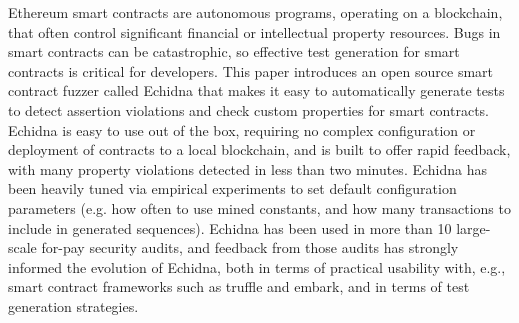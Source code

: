 Ethereum smart contracts are autonomous programs, operating on a blockchain, that often control significant financial or intellectual property resources.  Bugs in smart contracts can be catastrophic, so effective test generation for smart contracts is critical for developers.  This paper introduces an open source smart contract fuzzer called Echidna that makes it easy to automatically generate tests to detect assertion violations and check custom properties for smart contracts.  Echidna is easy to use out of the box, requiring no complex configuration or deployment of contracts to a local blockchain, and is built to offer rapid feedback, with many property violations detected in less than two minutes.  Echidna has been heavily tuned via empirical experiments to set default configuration parameters (e.g. how often to use mined constants, and how many transactions to include in generated sequences). Echidna has been used in more than 10 large-scale for-pay security audits, and feedback from those audits has strongly informed the evolution of Echidna, both in terms of practical usability with, e.g., smart contract frameworks such as truffle and embark, and in terms of test generation strategies.
